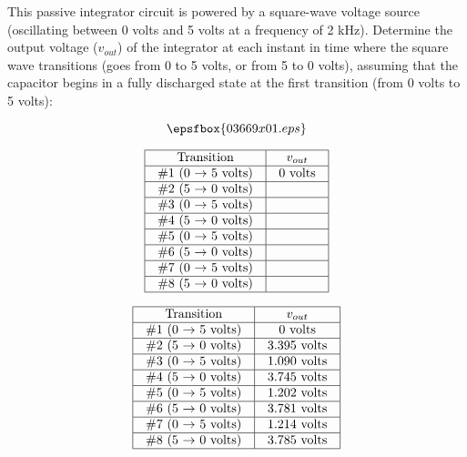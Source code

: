 

This passive integrator circuit is powered by a square-wave voltage source (oscillating between 0 volts and 5 volts at a frequency of 2 kHz).  Determine the output voltage ($v_{out}$) of the integrator at each instant in time where the square wave transitions (goes from 0 to 5 volts, or from 5 to 0 volts), assuming that the capacitor begins in a fully discharged state at the first transition (from 0 volts to 5 volts):

$$\epsfbox{03669x01.eps}$$


$$\vbox{\offinterlineskip
\halign{\strut
\vrule \quad\hfil # \ \hfil & 
\vrule \quad\hfil # \ \hfil \vrule \cr
\noalign{\hrule}
%
Transition & $v_{out}$ \cr
%
\noalign{\hrule}
%
\#1 (0 $\to$ 5 volts) & 0 volts \cr
%
\noalign{\hrule}
%
\#2 (5 $\to$ 0 volts) &  \cr
%
\noalign{\hrule}
%
\#3 (0 $\to$ 5 volts) &  \cr
%
\noalign{\hrule}
%
\#4 (5 $\to$ 0 volts) &  \cr
%
\noalign{\hrule}
%
\#5 (0 $\to$ 5 volts) &  \cr
%
\noalign{\hrule}
%
\#6 (5 $\to$ 0 volts) &  \cr
%
\noalign{\hrule}
%
\#7 (0 $\to$ 5 volts) &  \cr
%
\noalign{\hrule}
%
\#8 (5 $\to$ 0 volts) &  \cr
%
\noalign{\hrule}
} %
}$$ %








$$\vbox{\offinterlineskip
\halign{\strut
\vrule \quad\hfil # \ \hfil & 
\vrule \quad\hfil # \ \hfil \vrule \cr
\noalign{\hrule}
%
Transition & $v_{out}$ \cr
%
\noalign{\hrule}
%
\#1 (0 $\to$ 5 volts) & 0 volts \cr
%
\noalign{\hrule}
%
\#2 (5 $\to$ 0 volts) & 3.395 volts \cr
%
\noalign{\hrule}
%
\#3 (0 $\to$ 5 volts) & 1.090 volts \cr
%
\noalign{\hrule}
%
\#4 (5 $\to$ 0 volts) & 3.745 volts \cr
%
\noalign{\hrule}
%
\#5 (0 $\to$ 5 volts) & 1.202 volts \cr
%
\noalign{\hrule}
%
\#6 (5 $\to$ 0 volts) & 3.781 volts \cr
%
\noalign{\hrule}
%
\#7 (0 $\to$ 5 volts) & 1.214 volts \cr
%
\noalign{\hrule}
%
\#8 (5 $\to$ 0 volts) & 3.785 volts \cr
%
\noalign{\hrule}
} %
}$$ %

